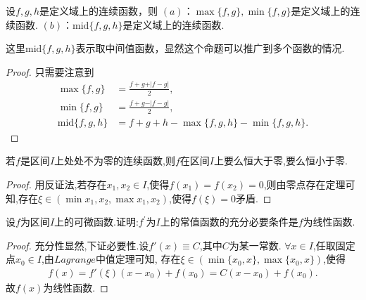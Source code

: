\documentclass[lang=cn,newtx,10pt,scheme=chinese]{elegantbook}
\begin{document}
\begin{proposition}[多个函数取最值或者中间值]\label{proposition:多个函数取最值或者中间值}
设\(f,g,h\)是定义域上的连续函数，则
\((a)\)：\(\max\{f,g\}, \min\{f,g\}\)是定义域上的连续函数.
\((b)\)：\(\text{mid}\{f,g,h\}\)是定义域上的连续函数.
\end{proposition}
\begin{remark}
这里\(\text{mid}\{f,g,h\}\)表示取中间值函数，显然这个命题可以推广到多个函数的情况.
\end{remark}
\begin{proof}
只需要注意到
\begin{align*}
\max\{f,g\}&=\frac{f + g+\vert f - g\vert}{2},\\
\min\{f,g\}&=\frac{f + g-\vert f - g\vert}{2},\\
\text{mid}\{f,g,h\}&=f + g + h-\max\{f,g,h\}-\min\{f,g,h\}.
\end{align*}
\end{proof}

\begin{proposition}\label{proposition:连续函数无零点则一定恒大于零或恒小于零}
若\(f\)是区间\(I\)上处处不为零的连续函数,则\(f\)在区间\(I\)上要么恒大于零,要么恒小于零.
\end{proposition}
\begin{proof}
用反证法,若存在$x_1,x_2\in I$,使得$f(x_1)=f(x_2)=0$,则由零点存在定理可知,存在$\xi \in (\min{x_1,x_2},\max{x_1,x_2})$,使得$f(\xi)=0$矛盾.
\end{proof}

\begin{proposition}\label{proposition:导数为常数的函数必是线性函数}
设\(f\)为区间\(I\)上的可微函数.证明:\(f^{\prime}\)为\(I\)上的常值函数的充分必要条件是\(f\)为线性函数.
\end{proposition}
\begin{proof}
充分性显然,下证必要性.设$f'(x)\equiv C$,其中$C$为某一常数.
$\forall x\in I$,任取固定点$x_0\in I$,由$Lagrange$中值定理可知,
存在$\xi\in(\min\{x_0,x\},\max\{x_0,x\})$,使得
\begin{align*}
f(x)=f'(\xi)(x-x_0)+f(x_0)=C(x-x_0)+f(x_0).
\end{align*}
故$f(x)$为线性函数.
\end{proof}
\end{document}
